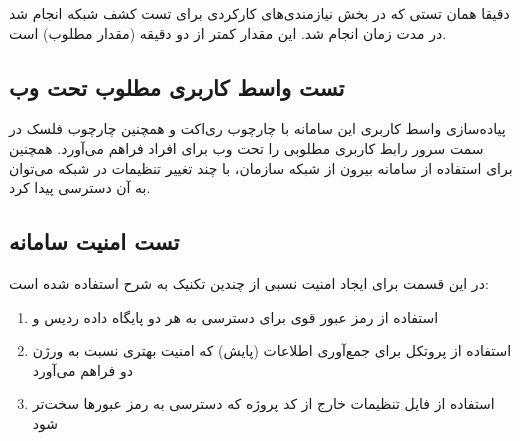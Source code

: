 دقیقا همان تستی که در بخش نیازمندی‌های کارکردی برای تست کشف شبکه انجام شد در مدت زمان  انجام شد. این مقدار کمتر از دو دقیقه (مقدار مطلوب) است.

\subsection{تست واسط کاربری مطلوب تحت وب}

پیاده‌سازی واسط کاربری این سامانه با چارچوب ری‌اکت و همچنین چارچوب فلسک در سمت سرور رابط کاربری مطلوبی را تحت وب برای افراد فراهم می‌آورد. همچنین برای استفاده از سامانه بیرون از شبکه سازمان، با چند تغییر تنظیمات در شبکه می‌توان به آن دسترسی پیدا کرد.

\subsection{تست امنیت سامانه }

در این قسمت برای ایجاد امنیت نسبی از چندین تکنیک به شرح استفاده شده است:

\begin{enumerate}
    \item استفاده از رمز عبور قوی برای دسترسی به هر دو پایگاه داده ردیس و  
    \item استفاده از پروتکل  برای جمع‌آوری اطلاعات (پایش) که امنیت بهتری نسبت به ورژن دو فراهم می‌آورد
    \item استفاده از فایل تنظیمات خارج از کد پروژه که دسترسی به رمز عبورها سخت‌تر شود

\end{enumerate}